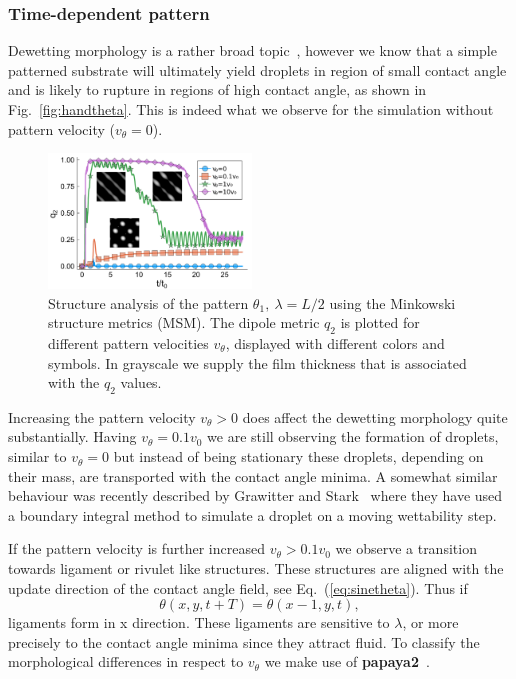 \documentclass[twocolumn,amsmath,amssymb,showpacs,pre,nofootinbib,superscriptaddress]{revtex4-1} %
\begin{document}
\subsubsection{Time-dependent pattern}\label{subsec:timedep}
Dewetting morphology is a rather broad topic~\cite{becker2003complex, RevModPhys.81.739, PhysRevLett.99.114503, craster2009dynamics, doi:10.1146/annurev-fluid-011212-140734, alizadeh_pahlavan_cueto-felgueroso_hosoi_mckinley_juanes_2018}, however we know that a simple patterned substrate will ultimately yield droplets in region of small contact angle and is likely to rupture in regions of high contact angle, as shown in Fig.~\ref{fig:handtheta}.
This is indeed what we observe for the simulation without pattern velocity ($v_{\theta} = 0$).
\begin{figure}
    \centering
    \includegraphics[width=0.48\textwidth]{Figures/q_2_different_v.pdf}
    \caption{Structure analysis of the pattern $\theta_1,~\lambda=L/2$ using the Minkowski structure metrics (MSM). 
    The dipole metric $q_2$ is plotted for different pattern velocities $v_{\theta}$, displayed with different colors and symbols.
    In grayscale we supply the film thickness that is associated with the $q_2$ values.
    }
    \label{fig:msm_q2}
\end{figure}
Increasing the pattern velocity $v_{\theta} > 0$ does affect the dewetting morphology quite substantially.
Having $v_{\theta} = 0.1 v_0$ we are still observing the formation of droplets, similar to $v_{\theta} = 0$ but instead of being stationary these droplets, depending on their mass, are transported with the contact angle minima.
A somewhat similar behaviour was recently described by Grawitter and Stark~\cite{D0SM02082F} where they have used a boundary integral method to simulate a droplet on a moving wettability step.

If the pattern velocity is further increased $v_{\theta} > 0.1 v_0$ we observe a transition towards ligament or rivulet like structures.
These structures are aligned with the update direction of the contact angle field, see Eq.~(\ref{eq:sinetheta}). 
Thus if
\begin{equation*}
    \theta(x,y,t+T) = \theta(x-1, y, t),    
\end{equation*}
ligaments form in x direction.
These ligaments are sensitive to $\lambda$, or more precisely to the contact angle minima since they attract fluid.
To classify the morphological differences in respect to $v_{\theta}$ we make use of \textbf{papaya2}~\cite{Schaller2020}.
\end{document}
